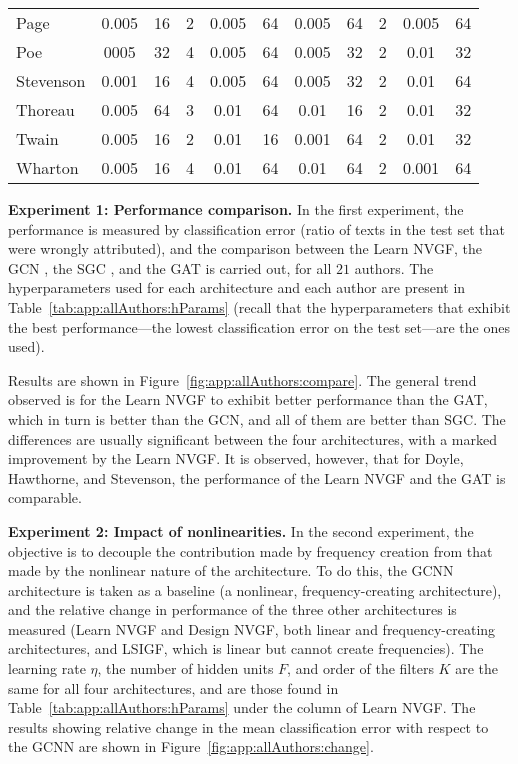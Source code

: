 \begin{table*}
\begin{tabular}{l|ccc|cc|ccc|cc}
        Page & 0.005 & 16 & 2 & 0.005 & 64 & 0.005 & 64 & 2 & 0.005 & 64 \\
        Poe & 0005 & 32 & 4 & 0.005 & 64 & 0.005 & 32 & 2 & 0.01 & 32 \\
        Stevenson & 0.001 & 16 & 4 & 0.005 & 64 & 0.005 & 32 & 2 & 0.01 & 64 \\
        Thoreau & 0.005 & 64 & 3 & 0.01 & 64 & 0.01 & 16 & 2 & 0.01 & 32 \\
        Twain & 0.005 & 16 & 2 & 0.01 & 16 & 0.001 & 64 & 2 & 0.01 & 32 \\
        Wharton & 0.005 & 16 & 4 & 0.01 & 64 & 0.01 & 64 & 2 & 0.001 & 64 \\
        \bottomrule
    \end{tabular}
\end{table*}

\textbf{Experiment 1: Performance comparison.} In the first experiment, the performance is measured by classification error (ratio of texts in the test set that were wrongly attributed), and the comparison between the Learn NVGF, the GCN \cite{Kipf2017-GCN}, the SGC \cite{Weinberger2019-SGC}, and the GAT \cite{Velickovic2018-GAT} is carried out, for all $21$ authors. The hyperparameters used for each architecture and each author are present in Table~\ref{tab:app:allAuthors:hParams} (recall that the hyperparameters that exhibit the best performance---the lowest classification error on the test set---are the ones used).

Results are shown in Figure~\ref{fig:app:allAuthors:compare}. The general trend observed is for the Learn NVGF to exhibit better performance than the GAT, which in turn is better than the GCN, and all of them are better than SGC. The differences are usually significant between the four architectures, with a marked improvement by the Learn NVGF. It is observed, however, that for Doyle, Hawthorne, and Stevenson, the performance of the Learn NVGF and the GAT is comparable.

\textbf{Experiment 2: Impact of nonlinearities.} In the second experiment, the objective is to decouple the contribution made by frequency creation from that made by the nonlinear nature of the architecture. To do this, the GCNN architecture is taken as a baseline (a nonlinear, frequency-creating architecture), and the relative change in performance of the three other architectures is measured (Learn NVGF and Design NVGF, both linear and frequency-creating architectures, and LSIGF, which is linear but cannot create frequencies). The learning rate $\eta$, the number of hidden units $F$, and order of the filters $K$ are the same for all four architectures, and are those found in Table~\ref{tab:app:allAuthors:hParams} under the column of Learn NVGF. The results showing relative change in the mean classification error with respect to the GCNN are shown in Figure~\ref{fig:app:allAuthors:change}.

